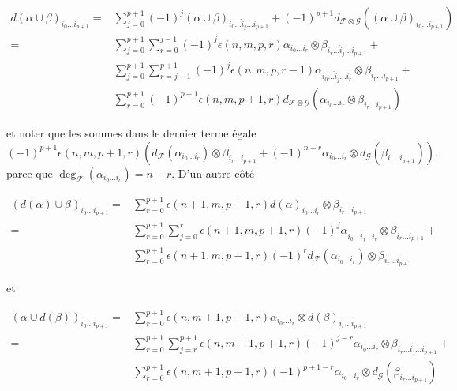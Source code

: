 \begin{align*}
d(\alpha \cup \beta)_{i_0 \ldots i_{p + 1}}
= &
\sum\nolimits_{j = 0}^{p + 1}
(-1)^j
(\alpha \cup \beta)_{i_0 \ldots \hat i_j \ldots i_{p + 1}}
+
(-1)^{p + 1}
d_{{\mathcal F} \otimes {\mathcal G}}
((\alpha \cup \beta)_{i_0 \ldots i_{p + 1}})
\\
= &
\sum\nolimits_{j = 0}^{p + 1}
\sum\nolimits_{r = 0}^{j - 1}
(-1)^j \epsilon(n, m, p, r)
\alpha_{i_0 \ldots i_r} \otimes \beta_{i_r \ldots \hat i_j \ldots i_{p + 1}}
+ \\
&
\sum\nolimits_{j = 0}^{p + 1}
\sum\nolimits_{r = j + 1}^{p + 1}
(-1)^j \epsilon(n, m, p, r - 1)
\alpha_{i_0 \ldots \hat i_j \ldots i_r} \otimes \beta_{i_r \ldots i_{p + 1}}
+ \\
&
\sum\nolimits_{r = 0}^{p + 1}
(-1)^{p + 1} \epsilon(n, m, p + 1, r)
d_{{\mathcal F} \otimes {\mathcal G}}
(\alpha_{i_0 \ldots i_r} \otimes \beta_{i_r \ldots i_{p + 1}})
\end{align*}

et noter que les sommes dans le dernier terme égale
$$
(-1)^{p + 1} \epsilon(n, m, p + 1, r)
\left(
d_{\mathcal F}(\alpha_{i_0 \ldots i_r}) \otimes 
\beta_{i_r \ldots i_{p + 1}} +
(-1)^{n - r}
\alpha_{i_0 \ldots i_r} \otimes d_{\mathcal G}(\beta_{i_r \ldots i_{p + 1}})
\right).
$$
parce que $\deg_\mathcal{F}(\alpha_{i_0 \ldots i_r}) = n - r$. D'un autre côté

\begin{align*}
(d(\alpha) \cup \beta)_{i_0\ldots i_{p + 1}}
= &
\sum\nolimits_{r = 0}^{p + 1}
\epsilon(n + 1, m, p + 1, r)
d(\alpha)_{i_0\ldots i_r} \otimes \beta_{i_r\ldots i_{p + 1}}
\\
= &
\sum\nolimits_{r = 0}^{p + 1}
\sum\nolimits_{j = 0}^{r}
\epsilon(n + 1, m, p + 1, r) (-1)^j
\alpha_{i_0\ldots\hat{i_j}\ldots i_r} \otimes \beta_{i_r\ldots i_{p + 1}}
+ \\
&
\sum\nolimits_{r = 0}^{p + 1}
\epsilon(n + 1, m, p + 1, r) (-1)^r
d_{\mathcal F}(\alpha_{i_0 \ldots i_r}) \otimes \beta_{i_r\ldots i_{p + 1}}
\end{align*}

et

\begin{align*}
(\alpha \cup d(\beta))_{i_0\ldots i_{p + 1}}
= &
\sum\nolimits_{r = 0}^{p + 1}
\epsilon(n, m + 1, p + 1, r)
\alpha_{i_0 \ldots i_r} \otimes d(\beta)_{i_r \ldots i_{p + 1}}
\\
= &
\sum\nolimits_{r = 0}^{p + 1}
\sum\nolimits_{j = r}^{p + 1}
\epsilon(n, m + 1, p + 1, r) (-1)^{j - r}
\alpha_{i_0 \ldots i_r} \otimes \beta_{i_r \ldots \hat{i_j}\ldots i_{p + 1}}
+ \\
&
\sum\nolimits_{r = 0}^{p + 1}
\epsilon(n, m + 1, p + 1, r) (-1)^{p + 1 - r}
\alpha_{i_0 \ldots i_r} \otimes d_{\mathcal G}(\beta_{i_r \ldots i_{p + 1}})
\end{align*}


